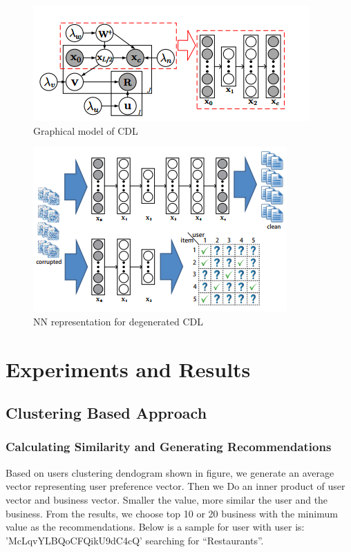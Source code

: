 \documentclass[11pt]{article}
\begin{document}
		\begin{figure}[h]
			\centering
			\includegraphics[scale=0.7]{cdl.png}
			\caption{Graphical model of CDL}
		\end{figure}
		\begin{figure}[h]
			\centering
			\includegraphics[scale=0.7]{cdl1.png}
			\caption{NN representation for degenerated CDL}
		\end{figure}
	\section{Experiments and Results}
	\subsection{Clustering Based Approach}
	\subsubsection{Calculating Similarity and Generating Recommendations}
	Based on users clustering dendogram shown in figure, we generate an average vector representing user preference vector. Then we Do an inner product of user vector and business vector. Smaller the value, more similar the user and the business. From the results, we choose top 10 or 20 business with the minimum value as the recommendations. Below is a sample for user with user is: 'McLqvYLBQoCFQikU9dC4cQ' searching for “Restaurants”.
\end{document}
